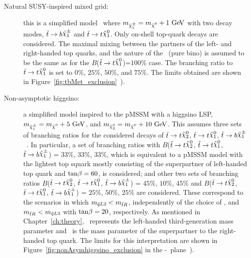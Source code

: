			\begin{description}
			  \item[\boldmath Natural SUSY-inspired mixed grid:] this is a simplified model~\cite{Papucci2011} where $m_{\chinoonepm}=\mLSP+1\gev$ with two decay modes, $\stop\to b \chinoonepm$ and $\stop\to t\LSP$. Only on-shell top-quark decays are considered. The maximal mixing between the partners of the left- and right-handed top quarks, and the nature of the \LSP\ (pure bino) is assumed to be the same as for the $B$($\stop\to t\LSP$)=$100\%$ case. The branching ratio to $\stop\to t\LSP$ is set to $0\%$, $25\%$, $50\%$, and $75\%$. The limits obtained are shown in Figure~\ref{fig:tbMet_exclusion}~\cite{stop0L}).

				\item[\boldmath Non-asymptotic higgsino:] a simplified model inspired to the \ac{pMSSM} with a higgsino \ac{LSP}, ${m_{\chinoonepm}=\mLSP+5\gev}$, and ${m_{\ninotwo}=\mLSP+10\gev}$. This assumes three sets of branching ratios for the considered decays of $\stop\to t\ninotwo$, $\stop\to t\LSP$, $\stop\to b\chinoonepm$~\cite{Papucci2011}. In particular, a set of branching ratios with $B$($\stop\to t\ninotwo$, $\stop\to t\LSP$, $\stop\to b\chinoonepm$) = $33\%$, $33\%$, $33\%$, which is equivalent to a \ac{pMSSM} model with the lightest top squark mostly consisting of the superpartner of left-handed top quark and $\mathrm{tan}\beta=60$, is considered; and other two sets of branching ratios $B$($\stop\to t\ninotwo$, $\stop\to t\LSP$, $\stop\to b\chinoonepm$) = $45\%$, $10\%$, $45\%$ and $B$($\stop\to t\ninotwo$, $\stop\to t\LSP$, $\stop\to b\chinoonepm$) = $25\%$, $50\%$, $25\%$ are considered. These correspond to the scenarios in which $m_{\tilde{q}L3} < m_{\tilde{t}R}$, independently of the choice of \tanb, and $m_{\tilde{t}R}<m_{\tilde{q}L3}$ with $\mathrm{tan}\beta=20$, respectively. As mentioned in Chapter~\ref{ch:theory}, \mqlthree\ represents the left-handed third-generation mass parameter and \mtr\ is the mass parameter of the superpartner to the right-handed top quark. The limits for this interpretation are shown in Figure~\ref{fig:nonAsymhiggsino_exclusion} in the \mstop-\mLSP\ plane~\cite{stop0L}).


\end{description}
